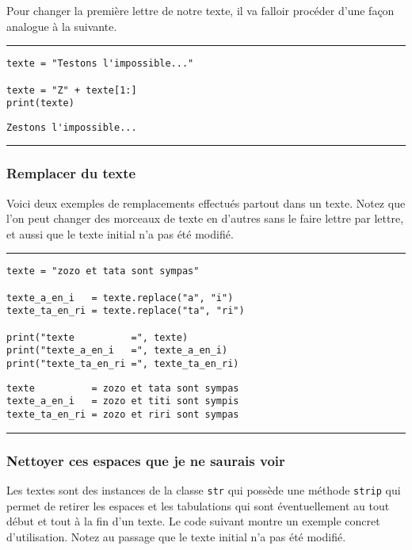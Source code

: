 Pour changer la première lettre de notre texte, il va falloir procéder d'une façon analogue à la suivante.


\bigskip
{\hrule height .5mm}
\begin{verbatim}
texte = "Testons l'impossible..."

texte = "Z" + texte[1:]
print(texte)
\end{verbatim}
 \color{ForestGreen}
\vspace{-1.5em}
\begin{verbatim}
Zestons l'impossible...
\end{verbatim} \color{Black}
{\hrule height .5mm}
\bigskip


\subsubsection{Remplacer du texte}

Voici deux exemples de remplacements effectués partout dans un texte. Notez que l'on peut changer des morceaux de texte en d'autres sans le faire lettre par lettre, et aussi que le texte initial n'a pas été modifié.


\bigskip
{\hrule height .5mm}
\begin{verbatim}
texte = "zozo et tata sont sympas"

texte_a_en_i   = texte.replace("a", "i")
texte_ta_en_ri = texte.replace("ta", "ri")

print("texte          =", texte)
print("texte_a_en_i   =", texte_a_en_i)
print("texte_ta_en_ri =", texte_ta_en_ri)
\end{verbatim}
 \color{ForestGreen}
\vspace{-1.5em}
\begin{verbatim}
texte          = zozo et tata sont sympas
texte_a_en_i   = zozo et titi sont sympis
texte_ta_en_ri = zozo et riri sont sympas
\end{verbatim} \color{Black}
{\hrule height .5mm}
\bigskip


\subsubsection{Nettoyer ces espaces que je ne saurais voir}

Les textes sont des instances de la classe \texttt{str} qui possède une méthode \texttt{strip} qui permet de retirer les espaces et les tabulations qui sont éventuellement au tout début et tout à la fin d'un texte. Le code suivant montre un exemple concret d'utilisation. Notez au passage que le texte initial n'a pas été modifié.


